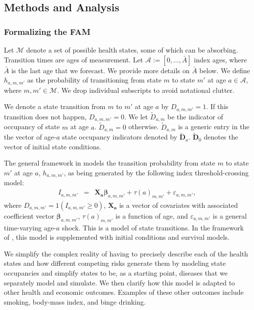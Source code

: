 \subsection{Methods and Analysis}

\subsubsection{Formalizing the FAM}
\label{section:transition_models}

Let $\mathcal{M}$ denote a set of possible health states, some of which can be absorbing. Transition times are ages of measurement. Let $\mathcal{A}:= [ 0, \ldots, \bar{A}]$ index ages, where $\bar{A}$ is the last age that we forecast. We provide more details on $\bar{A}$ below. We define $h_{a,m,m'}$ as the probability of transitioning from state $m$ to state $m'$ at age $a \in \mathcal{A}$, where $m, m' \in \mathcal{M}$. We drop individual subscripts to avoid notational clutter.

We denote a state transition from $m$ to $m'$ at age $a$ by $D_{a,m,m'} = 1$. If this transition does not happen,  $D_{a,m,m'} = 0$. We let $\tilde{D}_{a,m}$ be the indicator of occupancy of state $m$ at age $a$. $\tilde{D}_{a,m} = 0$ otherwise. $\tilde{D}_{a,m}$ is a generic entry in the the vector of age-$a$ state occupancy indicators denoted by $\tilde{\bm{D}}_a$. $\tilde{\bm{D}}_0$ denotes the vector of initial state conditions.

The general framework in \citet{Heckman_1981_heterogeneity,Heckman_1981_IncidentalParametersProblem} models the transition probability from state $m$ to state $m'$ at age $a$, $h_{a,m,m'}$, as being generated by the following index threshold-crossing model:
\begin{eqnarray}
I_{a,m,m'} &=& \bm{X_a} \bm{\beta}_{a,m,m'} + \tau \left( a \right)_{m,m'} + \varepsilon_{a,m,m'}, \label{eq:trans0}
\end{eqnarray}
where $D_{a,m,m'} = \bm{\mathit{1}}  \left( I_{a,m,m'} \geq 0 \right)$, $\bm{X_a}$ is a vector of covariates with associated coefficient vector $ \bm{\beta}_{a,m,m'}$, $\tau \left( a \right)_{m,m'}$ is a function of age, and $\varepsilon_{a,m,m'}$ is a general time-varying age-$a$ shock. This is a model of state transitions. In the framework of  \citet{Heckman_1981_heterogeneity,Heckman_1981_IncidentalParametersProblem}, this model is supplemented with initial conditions and survival models.

We simplify the complex reality of having to precisely describe each of the health states and how different competing risks generate them by modeling state occupancies and simplify states to be, as a starting point, diseases that we separately model and simulate. We then clarify how this model is adapted to other health and economic outcomes. Examples of these other outcomes include smoking, body-mass index, and binge drinking.

